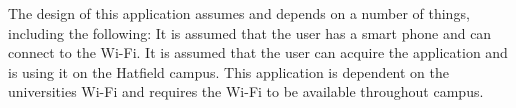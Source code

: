 \documentclass{article}
\begin{document}
{The design of this application assumes and depends on a number of things, including the following: It is assumed that the user has a smart phone and can connect to the Wi-Fi. It is assumed that the user can acquire the application and is using it on the Hatfield campus. This application is dependent on the universities Wi-Fi and requires the Wi-Fi to be available throughout campus.}
\end{document}
